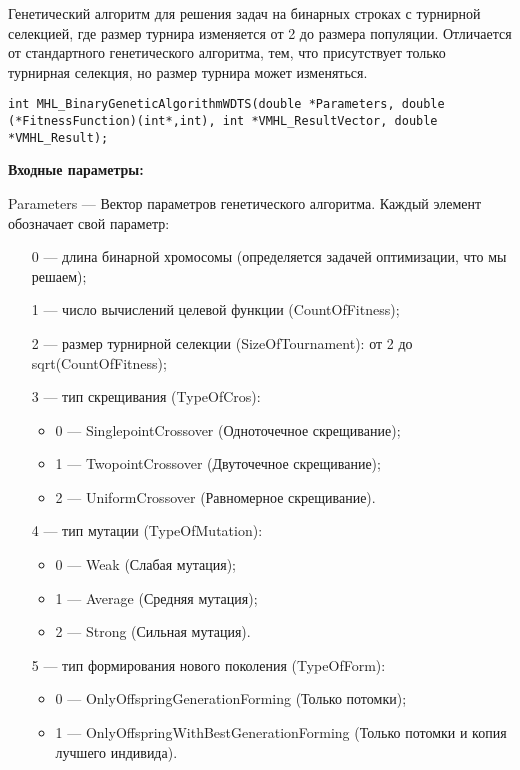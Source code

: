 \documentclass[a4paper,12pt]{article}
\begin{document}
Генетический алгоритм для решения задач на бинарных строках с турнирной селекцией, где размер турнира изменяется от 2 до размера популяции. Отличается от стандартного генетического алгоритма, тем, что присутствует только турнирная селекция, но размер турнира может изменяться.


\begin{lstlisting}[label=code_syntax_MHL_BinaryGeneticAlgorithmWDTS,caption=Синтаксис]
int MHL_BinaryGeneticAlgorithmWDTS(double *Parameters, double (*FitnessFunction)(int*,int), int *VMHL_ResultVector, double *VMHL_Result);
\end{lstlisting}

\textbf{Входные параметры:}
 
Parameters --- Вектор параметров генетического алгоритма. Каждый элемент обозначает свой параметр:
 
 \begin{itemize}
 \item [0] --- длина бинарной хромосомы (определяется задачей оптимизации, что мы решаем);
 
 \item [1] --- число вычислений целевой функции (CountOfFitness);
 
 \item [2] --- размер турнирной селекции (SizeOfTournament): от 2 до sqrt(CountOfFitness);
 
 \item [3] --- тип скрещивания (TypeOfCros):
  \begin{itemize}
       \item 0 --- SinglepointCrossover (Одноточечное скрещивание);
 
       \item 1 --- TwopointCrossover (Двуточечное скрещивание);
 
       \item 2 --- UniformCrossover (Равномерное скрещивание).
	    \end{itemize}
 
 \item [4] --- тип мутации (TypeOfMutation):
  \begin{itemize}
       \item 0 --- Weak (Слабая мутация);
 
       \item 1 --- Average (Средняя мутация);
 
       \item 2 --- Strong (Сильная мутация).
	    \end{itemize}
 
 \item [5] --- тип формирования нового поколения (TypeOfForm):
  \begin{itemize}
       \item 0 --- OnlyOffspringGenerationForming (Только потомки);
 
       \item 1 --- OnlyOffspringWithBestGenerationForming (Только потомки и копия лучшего индивида).
	    \end{itemize}
		
 \end{itemize}
 
\end{document}
